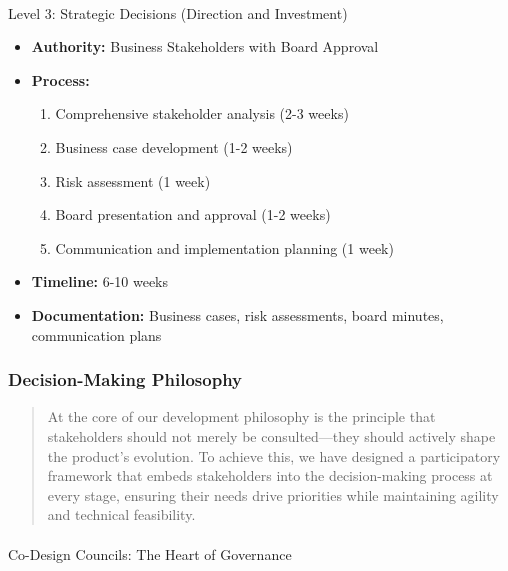 \documentclass[
  letterpaper,
  DIV=11,
  numbers=noendperiod]{scrartcl}
\makeatletter
\let\oldparagraph\paragraph
\renewcommand{\paragraph}{
    \@ifstar
      \xxxParagraphStar
      \xxxParagraphNoStar
  }
\newcommand{\xxxParagraphStar}[1]{\oldparagraph*{#1}\mbox{}}
\newcommand{\xxxParagraphNoStar}[1]{\oldparagraph{#1}\mbox{}}
\providecommand{\tightlist}{%
  \setlength{\itemsep}{0pt}\setlength{\parskip}{0pt}}\usepackage{longtable,booktabs,array}
\makeatother
\begin{document}
\paragraph{Level 3: Strategic Decisions (Direction and
Investment)}\label{level-3-strategic-decisions-direction-and-investment}

\begin{itemize}
\tightlist
\item
  \textbf{Authority:} Business Stakeholders with Board Approval
\item
  \textbf{Process:}

  \begin{enumerate}
  \def\labelenumi{\arabic{enumi}.}
  \tightlist
  \item
    Comprehensive stakeholder analysis (2-3 weeks)
  \item
    Business case development (1-2 weeks)
  \item
    Risk assessment (1 week)
  \item
    Board presentation and approval (1-2 weeks)
  \item
    Communication and implementation planning (1 week)
  \end{enumerate}
\item
  \textbf{Timeline:} 6-10 weeks
\item
  \textbf{Documentation:} Business cases, risk assessments, board
  minutes, communication plans
\end{itemize}

\subsubsection{Decision-Making
Philosophy}\label{decision-making-philosophy}

\begin{quote}
At the core of our development philosophy is the principle that
stakeholders should not merely be consulted---they should actively shape
the product's evolution. To achieve this, we have designed a
participatory framework that embeds stakeholders into the
decision-making process at every stage, ensuring their needs drive
priorities while maintaining agility and technical feasibility.
\end{quote}

\paragraph{Co-Design Councils: The Heart of
Governance}\label{co-design-councils-the-heart-of-governance}
\end{document}
